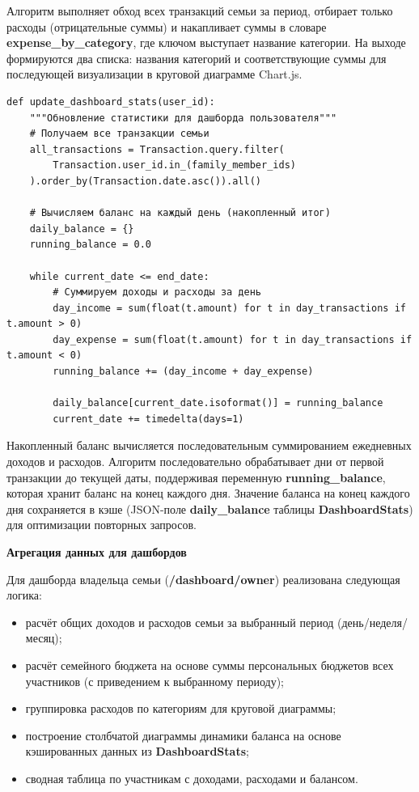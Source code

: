 Алгоритм выполняет обход всех транзакций семьи за период, отбирает только расходы (отрицательные суммы) и накапливает суммы в словаре \textbf{expense\_by\_category}, где ключом выступает название категории. На выходе формируются два списка: названия категорий и соответствующие суммы для последующей визуализации в круговой диаграмме Chart.js.

\begin{lstlisting}[caption=Листинг 3.3 — Расчёт накопленного баланса, label=lst:balance]
def update_dashboard_stats(user_id):
    """Обновление статистики для дашборда пользователя"""
    # Получаем все транзакции семьи
    all_transactions = Transaction.query.filter(
        Transaction.user_id.in_(family_member_ids)
    ).order_by(Transaction.date.asc()).all()
    
    # Вычисляем баланс на каждый день (накопленный итог)
    daily_balance = {}
    running_balance = 0.0
    
    while current_date <= end_date:
        # Суммируем доходы и расходы за день
        day_income = sum(float(t.amount) for t in day_transactions if t.amount > 0)
        day_expense = sum(float(t.amount) for t in day_transactions if t.amount < 0)
        running_balance += (day_income + day_expense)
        
        daily_balance[current_date.isoformat()] = running_balance
        current_date += timedelta(days=1)
\end{lstlisting}

Накопленный баланс вычисляется последовательным суммированием ежедневных доходов и расходов. Алгоритм последовательно обрабатывает дни от первой транзакции до текущей даты, поддерживая переменную \textbf{running\_balance}, которая хранит баланс на конец каждого дня. Значение баланса на конец каждого дня сохраняется в кэше (JSON-поле \textbf{daily\_balance} таблицы \textbf{DashboardStats}) для оптимизации повторных запросов.

\textbf{Агрегация данных для дашбордов}

Для дашборда владельца семьи (\textbf{/dashboard/owner}) реализована следующая логика:
\begin{itemize}
    \item расчёт общих доходов и расходов семьи за выбранный период (день/неделя/месяц);
    \item расчёт семейного бюджета на основе суммы персональных бюджетов всех участников (с приведением к выбранному периоду);
    \item группировка расходов по категориям для круговой диаграммы;
    \item построение столбчатой диаграммы динамики баланса на основе кэшированных данных из \textbf{DashboardStats};
    \item сводная таблица по участникам с доходами, расходами и балансом.
\end{itemize}

